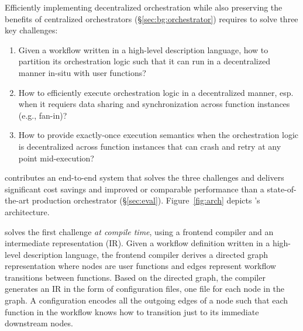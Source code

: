 Efficiently implementing decentralized orchestration while also preserving the
benefits of centralized orchestrators (\S\ref{sec:bg:orchestrator}) requires
\name{} to solve three key challenges:

\begin{enumerate}

	\item Given a workflow written in a high-level description language, how
	to partition its orchestration logic such that it can run in a
	decentralized manner in-situ with user functions?

	\item How to efficiently execute orchestration logic in a
	decentralized manner, esp. when it requiers data sharing and
	synchronization across function instances (e.g., fan-in)?

	\item How to provide exactly-once execution semantics when the
	orchestration logic is decentralized across function instances that can
	crash and retry at any point mid-execution?

\end{enumerate}

\name{} contributes an end-to-end system that solves the three challenges and
delivers significant cost savings and improved or comparable performance than
a state-of-the-art production orchestrator (\S\ref{sec:eval}).
Figure~\ref{fig:arch} depicts
\name{}'s architecture.  

\name{} solves the first challenge \emph{at compile time}, using a frontend
compiler and an intermediate representation (IR). Given a workflow definition
written in a high-level description language, the frontend compiler derives a
directed graph representation where nodes are user functions and edges
represent workflow transitions between functions. Based on the directed graph,
the compiler generates an IR in the form of configuration files, one file for
each node in the graph. A \name{} configuration encodes all the outgoing edges
of a node such that each function in the workflow knows how to transition just
to its immediate downstream nodes.

